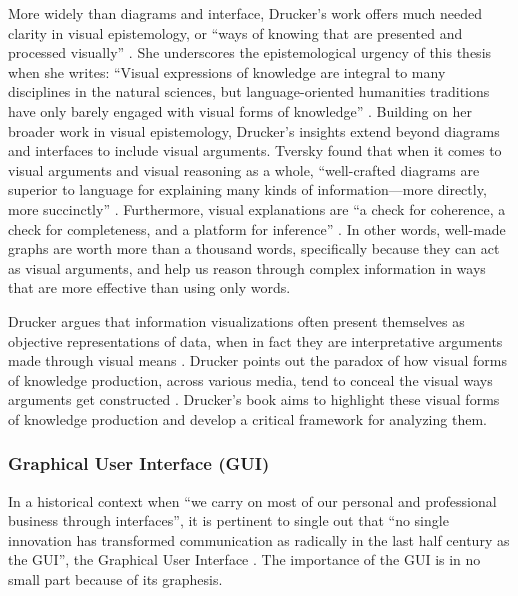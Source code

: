 More widely than diagrams and interface, Drucker’s work offers much needed clarity in visual epistemology, or ``ways of knowing that are presented and processed visually” \citep[p. 8]{drucker_graphesis_2014}. She underscores the epistemological urgency of this thesis when she writes: ``Visual expressions of knowledge are integral to many disciplines in the natural sciences, but language-oriented humanities traditions have only barely engaged with visual forms of knowledge” \citep[p. 7]{drucker_graphesis_2014}. Building on her broader work in visual epistemology, Drucker’s insights extend beyond diagrams and interfaces to include visual arguments. Tversky found that when it comes to visual arguments and visual reasoning as a whole, ``well-crafted diagrams are superior to language for explaining many kinds of information—more directly, more succinctly” \citep{tversky_barbara_2022}. Furthermore, visual explanations are ``a check for coherence, a check for completeness, and a platform for inference” \citep{tversky_barbara_2022}. In other words, well-made graphs are worth more than a thousand words, specifically because they can act as visual arguments, and help us reason through complex information in ways that are more effective than using only words. 

Drucker argues that information visualizations often present themselves as objective representations of data, when in fact they are interpretative arguments made through visual means \citep[p. 10]{drucker_graphesis_2014}. Drucker points out the paradox of how visual forms of knowledge production, across various media, tend to conceal the visual ways arguments get constructed \citep[p. 10]{drucker_graphesis_2014}. Drucker’s book aims to highlight these visual forms of knowledge production and develop a critical framework for analyzing them. 

\subsubsection{Graphical User Interface (GUI)}
In a historical context when ``we carry on most of our personal and professional business through interfaces”, it is pertinent to single out that ``no single innovation has transformed communication as radically in the last half century as the GUI”, the Graphical User Interface \citep[p. 7]{drucker_graphesis_2014}. The importance of the GUI is in no small part because of its graphesis. 

